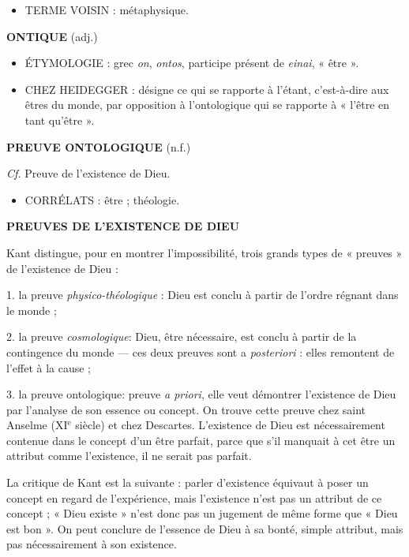 \begin{itemize}[leftmargin=1cm, label=, itemsep=1pt]
\item {\footnotesize TERME VOISIN} : métaphysique.
\end{itemize}

{\bf O{\footnotesize NTIQUE}} (adj.)

\begin{itemize}[leftmargin=1cm, label=, itemsep=1pt]
\item {\footnotesize ÉTYMOLOGIE} : grec {\it on}, {\it ontos}, participe présent de {\it einai}, « être ».
\item {\footnotesize CHEZ HEIDEGGER} : désigne ce qui se rapporte à l'étant, c'est-à-dire aux êtres du monde, par opposition à l'ontologique qui se rapporte à « l'être en tant qu'être ».
\end{itemize}


{\bf P{\footnotesize REUVE ONTOLOGIQUE}} (n.f.)

{\it Cf.} Preuve de l'existence de Dieu.

\begin{itemize}[leftmargin=1cm, label=, itemsep=1pt]
\item {\footnotesize CORRÉLATS} : être ; théologie.
\end{itemize}

{\bf P{\footnotesize REUVES DE L’EXISTENCE DE DIEU}}

Kant distingue, pour en montrer l'impossibilité,
trois grands types de « preuves » de l'existence de Dieu :

1. la preuve {\it physico-théologique} : Dieu
est conclu à partir de l'ordre régnant
dans le monde ;

2. la preuve {\it cosmologique}: Dieu, être
nécessaire, est conclu à partir de la
contingence du monde — ces deux
preuves sont a {\it posteriori} : elles
remontent de l'effet à la cause ;

3. la preuve {\it }ontologique: preuve {\it a priori}, elle veut démontrer l'existence
de Dieu par l'analyse de son essence ou
concept. On trouve cette preuve chez
saint Anselme ({\footnotesize XI}$^\text{e}$ siècle) et chez Descartes. L'existence de Dieu est nécessairement contenue dans le concept
d'un être parfait, parce que s’il manquait
à cet être un attribut comme l'existence,
il ne serait pas parfait.

La critique de Kant est la suivante : parler d’existence équivaut à poser un
concept en regard de l’expérience, mais
l'existence n’est pas un attribut de ce
concept ; « Dieu existe » n’est donc pas
un jugement de même forme que « Dieu
est bon ». On peut conclure de l'essence
de Dieu à sa bonté, simple attribut, mais
pas nécessairement à son existence.

